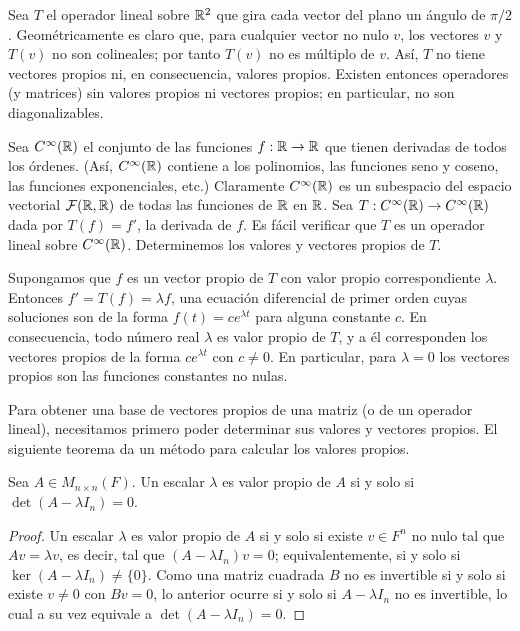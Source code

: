 \documentclass[12pt,a4paper]{book}
\begin{document}
    \begin{ejemplo}
        Sea $T$ el operador lineal sobre $\mathbb{R}^2$ que gira cada vector del plano un ángulo de $\pi/2$. Geométricamente es claro que, para cualquier vector no nulo $v$, los vectores $v$ y $T(v)$ no son colineales; por tanto $T(v)$ no es múltiplo de $v$. Así, $T$ no tiene vectores propios ni, en consecuencia, valores propios. Existen entonces operadores (y matrices) sin valores propios ni vectores propios; en particular, no son diagonalizables.
    \end{ejemplo}

    \begin{ejemplo}
        Sea $C^\infty(\mathbb{R})$ el conjunto de las funciones $f : \mathbb{R} \to \mathbb{R}$ que tienen derivadas de todos los órdenes. (Así, $C^\infty(\mathbb{R})$ contiene a los polinomios, las funciones seno y coseno, las funciones exponenciales, etc.) Claramente $C^\infty(\mathbb{R})$ es un subespacio del espacio vectorial $\mathcal{F}(\mathbb{R},\mathbb{R})$ de todas las funciones de $\mathbb{R}$ en $\mathbb{R}$. Sea $T : C^\infty(\mathbb{R}) \to C^\infty(\mathbb{R})$ dada por $T(f) = f'$, la derivada de $f$. Es fácil verificar que $T$ es un operador lineal sobre $C^\infty(\mathbb{R})$. Determinemos los valores y vectores propios de $T$.

        Supongamos que $f$ es un vector propio de $T$ con valor propio correspondiente $\lambda$. Entonces $f' = T(f) = \lambda f$, una ecuación diferencial de primer orden cuyas soluciones son de la forma $f(t) = c e^{\lambda t}$ para alguna constante $c$. En consecuencia, todo número real $\lambda$ es valor propio de $T$, y a él corresponden los vectores propios de la forma $c e^{\lambda t}$ con $c \neq 0$. En particular, para $\lambda = 0$ los vectores propios son las funciones constantes no nulas.
    \end{ejemplo}

    Para obtener una base de vectores propios de una matriz (o de un operador lineal), necesitamos primero poder determinar sus valores y vectores propios. El siguiente teorema da un método para calcular los valores propios.

    \begin{teorema}
        Sea $A \in M_{n \times n}(F)$. Un escalar $\lambda$ es valor propio de $A$ si y solo si $\det(A - \lambda I_n) = 0$.
    \end{teorema}

    \begin{proof}
        Un escalar $\lambda$ es valor propio de $A$ si y solo si existe $v \in F^n$ no nulo tal que $Av = \lambda v$, es decir, tal que $(A - \lambda I_n)v = 0$; equivalentemente, si y solo si $\ker(A - \lambda I_n) \neq \{0\}$. Como una matriz cuadrada $B$ no es invertible si y solo si existe $v \neq 0$ con $Bv = 0$, lo anterior ocurre si y solo si $A - \lambda I_n$ no es invertible, lo cual a su vez equivale a $\det(A - \lambda I_n) = 0$.
    \end{proof}
\end{document}
